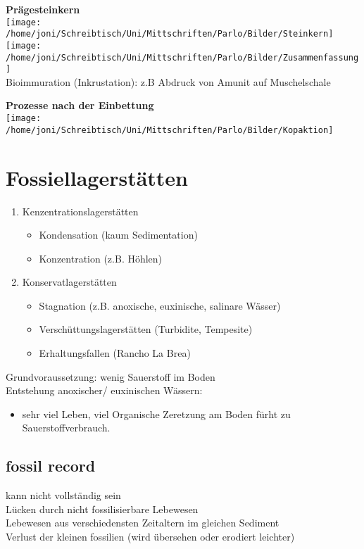 \documentclass[a4paper,12pt]{scrartcl}
\begin{document}
\textbf{Prägesteinkern}\\
\texttt{[image: /home/joni/Schreibtisch/Uni/Mittschriften/Parlo/Bilder/Steinkern]}\\
\texttt{[image: /home/joni/Schreibtisch/Uni/Mittschriften/Parlo/Bilder/Zusammenfassung]}\\

Bioimmuration (Inkrustation): z.B Abdruck von Amunit auf Muschelschale

\textbf{Prozesse nach der Einbettung}\\
\texttt{[image: /home/joni/Schreibtisch/Uni/Mittschriften/Parlo/Bilder/Kopaktion]}\\

\newpage
\section{Fossiellagerstätten}
\begin{enumerate}
\item Kenzentrationslagerstätten
\begin{itemize}
\item Kondensation (kaum Sedimentation)
\item Konzentration (z.B. Höhlen)
\end{itemize}
\item Konservatlagerstätten
\begin{itemize}
\item Stagnation (z.B. anoxische, euxinische, salinare Wässer)
\item Verschüttungslagerstätten (Turbidite, Tempesite)
\item Erhaltungsfallen (Rancho La Brea)
\end{itemize}
\end{enumerate}

Grundvoraussetzung: wenig Sauerstoff im Boden\\
Entstehung anoxischer/ euxinischen Wässern: \\
\begin{itemize}
\item sehr viel Leben, viel Organische Zeretzung am Boden fürht zu Sauerstoffverbrauch.
\end{itemize}

\subsection{fossil record}
kann nicht vollständig sein\\
Lücken durch nicht fossilisierbare Lebewesen\\
Lebewesen aus verschiedensten Zeitaltern im gleichen Sediment\\
Verlust der kleinen fossilien (wird übersehen oder erodiert leichter)
\end{document}
